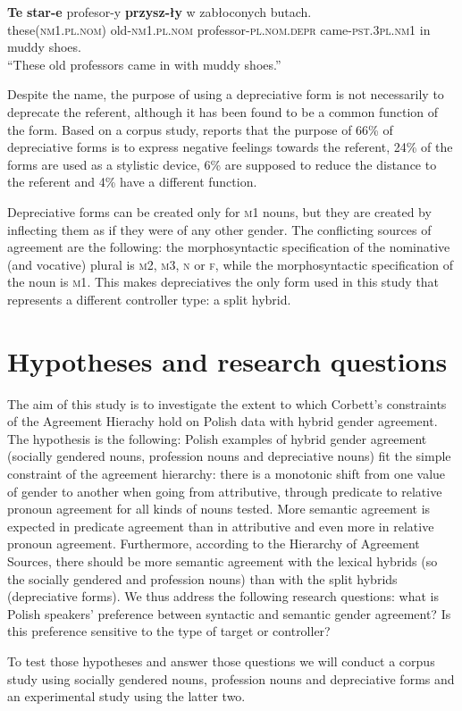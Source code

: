 \begin{exe}
  \ex\label{ex:profesory}
  \gll \textbf{Te} \textbf{star-e} profesor-y \textbf{przysz-ły} w zabłoconych butach.\\
  these\textsc{(nm1.pl.nom)} old\textsc{-nm1.pl.nom} professor\textsc{-pl.nom.depr} came\textsc{-pst.3pl.nm1} in muddy shoes.\\
  \trans ``These old professors came in with muddy shoes.''
\end{exe}

Despite the name, the purpose of using a depreciative form is not necessarily to deprecate the referent, although it has been found to be a common function of the form. Based on a corpus study, \cite{siuda_funkcje_2010} reports that the purpose of 66\% of depreciative forms is to express negative feelings towards the referent, 24\% of the forms are used as a stylistic device, 6\% are supposed to reduce the distance to the referent and 4\% have a different function.

Depreciative forms can be created only for \textsc{m1} nouns, but they are created by inflecting them as if they were of any other gender. The conflicting sources of agreement are the following: the morphosyntactic specification of the nominative (and vocative) plural is \textsc{m2}, \textsc{m3}, \textsc{n} or \textsc{f}, while the morphosyntactic specification of the noun is \textsc{m1}. This makes depreciatives the only form used in this study that represents a different controller type: a split hybrid.

\section{Hypotheses and research questions}
The aim of this study is to investigate the extent to which Corbett's constraints of the Agreement Hierachy hold on Polish data with hybrid gender agreement. The hypothesis is the following: Polish examples of hybrid gender agreement (socially gendered nouns, profession nouns and depreciative nouns) fit the simple constraint of the agreement hierarchy: there is a monotonic shift from one value of gender to another when going from attributive, through predicate to relative pronoun agreement for all kinds of nouns tested. More semantic agreement is expected in predicate agreement than in attributive and even more in relative pronoun agreement. Furthermore, according to the Hierarchy of Agreement Sources, there should be more semantic agreement with the lexical hybrids (so the socially gendered and profession nouns) than with the split hybrids (depreciative forms). We thus address the following research questions: what is Polish speakers' preference between syntactic and semantic gender agreement? Is this preference sensitive to the type of target or controller? 

To test those hypotheses and answer those questions we will conduct a corpus study using socially gendered nouns, profession nouns and depreciative forms and an experimental study using the latter two.
